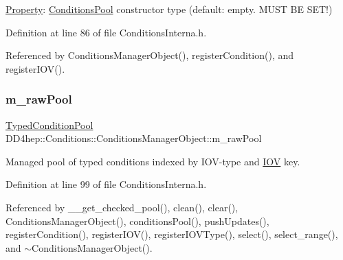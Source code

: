 \hyperlink{class_d_d4hep_1_1_property}{Property}\+: \hyperlink{class_d_d4hep_1_1_conditions_1_1_conditions_pool}{Conditions\+Pool} constructor type (default\+: empty. M\+U\+ST BE S\+E\+T!) 



Definition at line 86 of file Conditions\+Interna.\+h.



Referenced by Conditions\+Manager\+Object(), register\+Condition(), and register\+I\+O\+V().

\hypertarget{class_d_d4hep_1_1_conditions_1_1_conditions_manager_object_a90c9b5060b3a6299aa7d5d4e9a0d8105}{}\label{class_d_d4hep_1_1_conditions_1_1_conditions_manager_object_a90c9b5060b3a6299aa7d5d4e9a0d8105} 
\subsubsection{\texorpdfstring{m\+\_\+raw\+Pool}{m\_rawPool}}
{\footnotesize\ttfamily \hyperlink{class_d_d4hep_1_1_conditions_1_1_conditions_manager_object_a1617c134372fbb79d06990707f19bb0c}{Typed\+Condition\+Pool} D\+D4hep\+::\+Conditions\+::\+Conditions\+Manager\+Object\+::m\+\_\+raw\+Pool}



Managed pool of typed conditions indexed by I\+O\+V-\/type and \hyperlink{class_d_d4hep_1_1_i_o_v}{I\+OV} key. 



Definition at line 99 of file Conditions\+Interna.\+h.



Referenced by \+\_\+\+\_\+get\+\_\+checked\+\_\+pool(), clean(), clear(), Conditions\+Manager\+Object(), conditions\+Pool(), push\+Updates(), register\+Condition(), register\+I\+O\+V(), register\+I\+O\+V\+Type(), select(), select\+\_\+range(), and $\sim$\+Conditions\+Manager\+Object().

\hypertarget{class_d_d4hep_1_1_conditions_1_1_conditions_manager_object_a4da3e311e9b9121fef58f2cd80da12f9}{}\label{class_d_d4hep_1_1_conditions_1_1_conditions_manager_object_a4da3e311e9b9121fef58f2cd80da12f9} 
